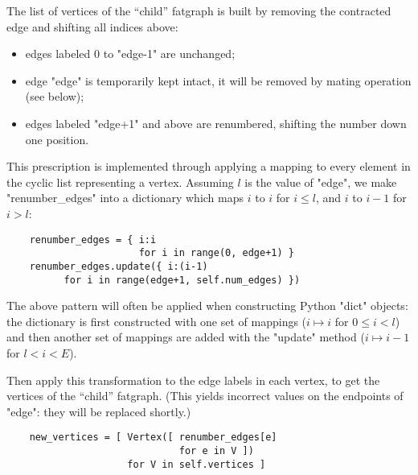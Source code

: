 The list of vertices of the ``child'' fatgraph is built by removing
the contracted edge and shifting all indices above:
\begin{itemize}
\item edges labeled 0 to "edge-1" are unchanged;
\item edge "edge" is temporarily kept intact, it will be
  removed by mating operation (see below);
\item edges labeled "edge+1" and above are renumbered, 
  shifting the number down one position.
\end{itemize}
This prescription is implemented through applying a mapping to every
element in the cyclic list representing a vertex.  Assuming $l$ is the
value of "edge", we make "renumber_edges" into a dictionary which
maps $i$ to $i$ for $i \leq l$, and $i$ to $i-1$ for $i > l$:
\begin{lstlisting}
    renumber_edges = { i:i 
                       for i in range(0, edge+1) }
    renumber_edges.update({ i:(i-1)
          for i in range(edge+1, self.num_edges) })
\end{lstlisting}
The above pattern will often be applied when constructing Python
"dict" objects: the dictionary is first constructed with one set of
mappings ($i \mapsto i$ for $0 \leq i < l$) and then another set of
mappings are added with the "update" method ($i \mapsto i-1$ for $l <
i < E$).

Then apply this transformation to the edge labels in each vertex, to
get the vertices of the ``child'' fatgraph. (This yields incorrect
values on the endpoints of "edge": they will be replaced shortly.)
\begin{lstlisting}
    new_vertices = [ Vertex([ renumber_edges[e] 
                              for e in V ])
                     for V in self.vertices ]

\end{lstlisting}

